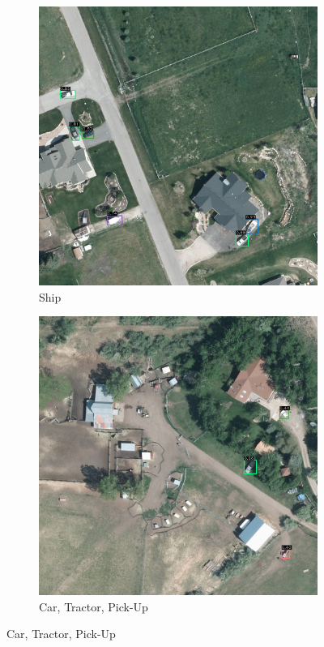\begin{figure}[h!]
    \begin{subfigure}[t]{0.38\textwidth}
        \centering
        \includegraphics[width=\linewidth]{images/015Results/01abb_vs_obb/comp_images/abb/509.png}
        \caption{Ship}
    \end{subfigure}
    \begin{subfigure}[t]{0.38\textwidth}
        \centering
        \includegraphics[width=\linewidth]{images/015Results/01abb_vs_obb/comp_images/abb/523.png}
        \caption{Car, Tractor, Pick-Up}
    \end{subfigure}
    

\end{figure}
